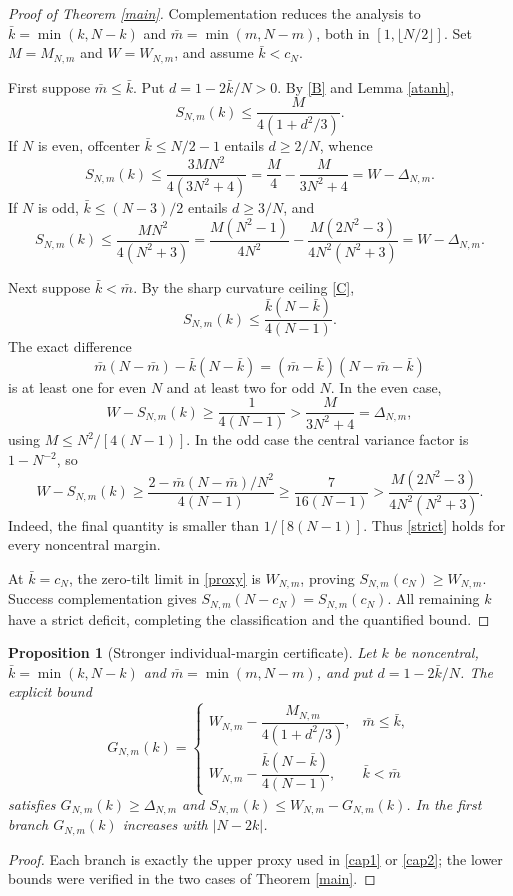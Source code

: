 \documentclass[11pt]{article}
\numberwithin{equation}{section}
\newtheorem{proposition}[theorem]{Proposition}
\theoremstyle{remark}\newtheorem{remark}[theorem]{Remark}
\begin{document}
\begin{proof}[Proof of Theorem \ref{main}]
Complementation reduces the analysis to
$\bar k=\min(k,N-k)$ and $\bar m=\min(m,N-m)$, both in
$[1,\lfloor N/2\rfloor]$. Set $M=M_{N,m}$ and $W=W_{N,m}$,
and assume $\bar k<c_N$.

First suppose $\bar m\le\bar k$. Put $d=1-2\bar k/N>0$.
By \eqref{B} and Lemma \ref{atanh},
\begin{equation}\label{cap1}
S_{N,m}(k)\le\frac{M}{4(1+d^2/3)}.
\end{equation}
If $N$ is even, offcenter $\bar k\le N/2-1$ entails
$d\ge 2/N$, whence
\[
S_{N,m}(k)\le
\frac{3MN^2}{4(3N^2+4)}
=\frac{M}{4}-\frac{M}{3N^2+4}=W-\Delta_{N,m}.
\]
If $N$ is odd, $\bar k\le(N-3)/2$ entails $d\ge3/N$,
and
\[
S_{N,m}(k)\le\frac{MN^2}{4(N^2+3)}
=\frac{M(N^2-1)}{4N^2}
-\frac{M(2N^2-3)}{4N^2(N^2+3)}
=W-\Delta_{N,m}.
\]

Next suppose $\bar k<\bar m$. By the sharp curvature
ceiling \eqref{C},
\begin{equation}\label{cap2}
S_{N,m}(k)\le
\frac{\bar k(N-\bar k)}{4(N-1)}.
\end{equation}
The exact difference
\begin{equation}\label{disc}
\bar m(N-\bar m)-\bar k(N-\bar k)
=(\bar m-\bar k)(N-\bar m-\bar k)
\end{equation}
is at least one for even $N$ and at least two for odd $N$.
In the even case,
\[
W-S_{N,m}(k)\ge\frac{1}{4(N-1)}
>\frac{M}{3N^2+4}=\Delta_{N,m},
\]
using $M\le N^2/[4(N-1)]$.
In the odd case the central variance factor is $1-N^{-2}$, so
\[
W-S_{N,m}(k)\ge
\frac{2-\bar m(N-\bar m)/N^2}{4(N-1)}
\ge\frac{7}{16(N-1)}
>\frac{M(2N^2-3)}{4N^2(N^2+3)}.
\]
Indeed, the final quantity is smaller than $1/[8(N-1)]$.
Thus \eqref{strict} holds for every noncentral margin.

At $\bar k=c_N$, the zero-tilt limit in \eqref{proxy} is
$W_{N,m}$, proving $S_{N,m}(c_N)\ge W_{N,m}$.
Success complementation gives
$S_{N,m}(N-c_N)=S_{N,m}(c_N)$.
All remaining $k$ have a strict deficit, completing the
classification and the quantified bound.
\end{proof}

\begin{proposition}[Stronger individual-margin certificate]\label{individual}
Let $k$ be noncentral, $\bar k=\min(k,N-k)$ and
$\bar m=\min(m,N-m)$, and put $d=1-2\bar k/N$.
The explicit bound
\[
G_{N,m}(k)=
\begin{cases}
W_{N,m}-\dfrac{M_{N,m}}{4(1+d^2/3)},&\bar m\le\bar k,\\[8pt]
W_{N,m}-\dfrac{\bar k(N-\bar k)}{4(N-1)},&\bar k<\bar m
\end{cases}
\]
satisfies $G_{N,m}(k)\ge\Delta_{N,m}$ and
$S_{N,m}(k)\le W_{N,m}-G_{N,m}(k)$.
In the first branch $G_{N,m}(k)$ increases with
$|N-2k|$.
\end{proposition}
\begin{proof}
Each branch is exactly the upper proxy used in
\eqref{cap1} or \eqref{cap2}; the lower bounds were
verified in the two cases of Theorem \ref{main}.
\end{proof}
\end{document}
